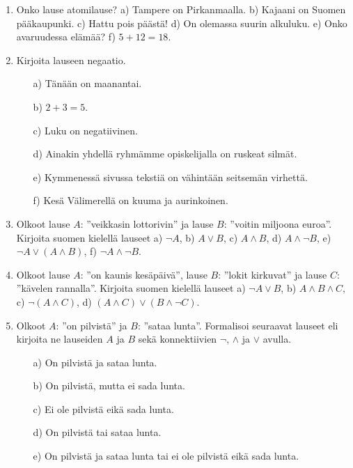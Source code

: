 

\Harjoitustehtavat

\begin{enumerate}
\item Onko lause atomilause?
a) Tampere on Pirkanmaalla. b) Kajaani on Suomen pääkaupunki. c) Hattu pois päästä! d) On olemassa suurin alkuluku.
e) Onko avaruudessa elämää? f) $5 + 12 = 18$.

\item Kirjoita lauseen negaatio.
\begin{itemize}
\item[a)] Tänään on maanantai.
\item[b)] $2+3=5$.
\item[c)] Luku on negatiivinen.
\item[d)] Ainakin yhdellä ryhmämme opiskelijalla on ruskeat silmät.
\item[e)] Kymmenessä sivussa tekstiä on vähintään seitsemän virhettä.
\item[f)] Kesä Välimerellä on kuuma ja aurinkoinen.
\end{itemize}

\item Olkoot lause $A$: ''veikkasin lottorivin'' ja lause $B$: ''voitin miljoona euroa''. Kirjoita suomen kielellä lauseet
a) $\lnot A$, b) $A\lor B$, c) $A\land B$, d) $A\land \lnot B$,  
e) $\lnot A\lor (A\land B)$, f) $\lnot A\land \lnot B$.

\item
Olkoot lause $A$: ''on kaunis kesäpäivä'',  lause $B$: ''lokit kirkuvat'' ja lause $C$: ''kävelen rannalla''. Kirjoita suomen kielellä lauseet
a) $\lnot A\lor B$,
b) $A\land B \land C$, c)
$\lnot(A\land C)$,
d) $(A\land C)\lor (B\land
\lnot C)$.

\item Olkoot $A$: ''on pilvistä'' ja $B$: ''sataa
lunta''. Formalisoi seuraavat lauseet eli kirjoita ne
lauseiden $A$ ja $B$ sekä konnektiivien $\lnot$, $\land$
ja $\lor$ avulla.
\begin{itemize}
\item[a)] On pilvistä ja sataa lunta.
\item[b)] On pilvistä, mutta ei sada lunta.
\item[c)] Ei ole pilvistä eikä sada lunta.
\item[d)] On pilvistä tai sataa lunta.
\item[e)] On pilvistä ja sataa lunta tai ei ole pilvistä
eikä sada lunta.
\end{itemize}


\end{enumerate}

